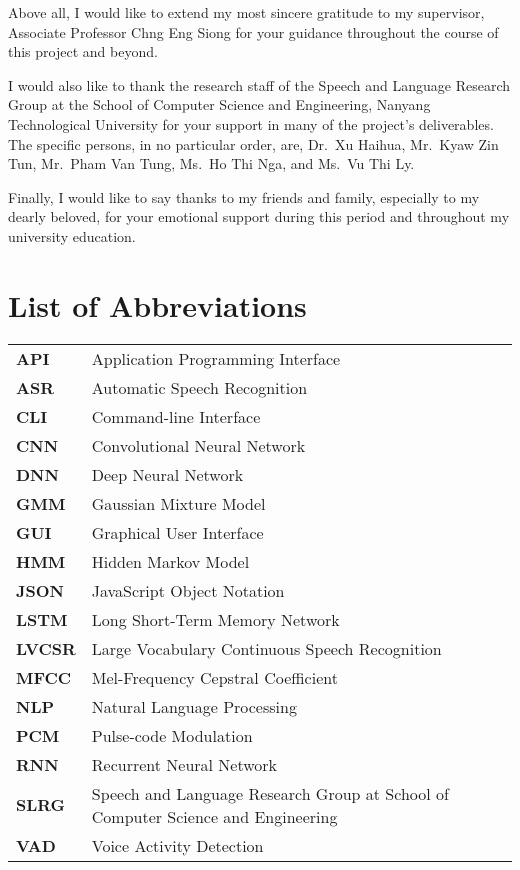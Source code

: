 Above all, I would like to extend my most sincere gratitude to my supervisor,
Associate Professor Chng Eng Siong for your guidance throughout
the course of this project and beyond.

I would also like to thank the research staff of the Speech
and Language Research Group at the School of Computer Science and Engineering,
Nanyang Technological University for your support in many of the project's
deliverables. The specific persons, in no particular order, are, Dr.\ Xu Haihua,
Mr.\ Kyaw Zin Tun, Mr.\ Pham Van Tung, Ms.\ Ho Thi Nga, and Ms.\ Vu Thi Ly.

Finally, I would like to say thanks to my friends and family, especially to my
dearly beloved, for your emotional support during this period and throughout my
university education.
\newpage

\tableofcontents
\newpage

\listoffigures
\newpage

\listoftables
\newpage

\chapter*{List of Abbreviations}
\begin{tabu}{lX}
    \textbf{API} & Application Programming Interface \\
    \textbf{ASR} & Automatic Speech Recognition \\
    \textbf{CLI} & Command-line Interface \\
    \textbf{CNN} & Convolutional Neural Network \\
    \textbf{DNN} & Deep Neural Network \\
    \textbf{GMM} & Gaussian Mixture Model \\
    \textbf{GUI} & Graphical User Interface \\
    \textbf{HMM} & Hidden Markov Model \\
    \textbf{JSON} & JavaScript Object Notation \\
    \textbf{LSTM} & Long Short-Term Memory Network \\
    \textbf{LVCSR} & Large Vocabulary Continuous Speech Recognition \\
    \textbf{MFCC} & Mel-Frequency Cepstral Coefficient \\
    \textbf{NLP} & Natural Language Processing \\
    \textbf{PCM} & Pulse-code Modulation \\
    \textbf{RNN} & Recurrent Neural Network \\
    \textbf{SLRG} & Speech and Language Research Group at School of Computer
    Science and Engineering \\
    \textbf{VAD} & Voice Activity Detection
\end{tabu}
\newpage
